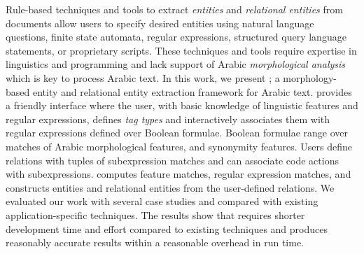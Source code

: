 Rule-based techniques and tools to extract {\em entities} and {\em relational entities} from documents allow users to specify desired entities using natural language questions, finite state automata, regular expressions, structured query language statements, or proprietary scripts.  These techniques and tools require expertise in linguistics and programming and lack support of Arabic {\em morphological analysis} which is key to process Arabic text.
In this work, we present \framework; a morphology-based entity and relational entity extraction framework for Arabic text.  \framework provides a friendly interface where the user, with basic knowledge of linguistic features and regular expressions, defines {\em tag types} and interactively associates them with regular expressions defined over Boolean formulae. Boolean formulae range over matches of Arabic morphological features, and synonymity features. Users define relations with tuples of subexpression matches and can associate code actions with subexpressions. \framework computes feature matches, regular expression matches, and constructs entities and relational entities from the user-defined relations. We evaluated our work with several case studies and compared with existing application-specific techniques. The results show that \framework requires shorter development time and effort compared to existing techniques and produces reasonably accurate results within a reasonable overhead in run time.